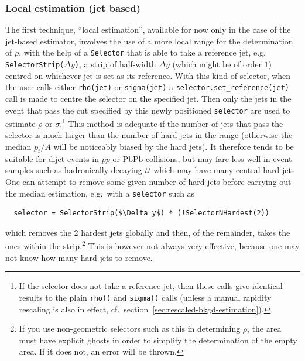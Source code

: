 \documentclass[12pt,a4]{article}
\newcommand{\ttt}[1]{{\small\texttt{#1}}}
\begin{document}
\subsubsection{Local estimation (jet based)}
\label{sec:local-bkgd-estimation}

The first technique, ``local estimation'', available for now only in
the case of the jet-based estimator, involves the use of a more local
range for the determination of $\rho$, with the help of a
\ttt{Selector} that is able to take a reference jet,
e.g. \ttt{SelectorStrip(}$\Delta y$\ttt{)}, a strip of half-width
$\Delta y$ (which might be of order $1$) centred on whichever jet is
set as its reference.
%
With this kind of selector, when the user calls either \ttt{rho(jet)}
or \ttt{sigma(jet)} a \ttt{selector.set\_reference(jet)} call is made
to centre the selector on the specified jet. Then only the jets in the
event that
pass the cut specified by this newly positioned \ttt{selector} are
used to estimate $\rho$ or $\sigma$.\footnote{If the selector does not
  take a reference jet, then these calls give identical results to the
  plain \texttt{rho()} and \texttt{sigma()} calls (unless a manual
  rapidity rescaling is also in effect, cf.\
  section~\ref{sec:rescaled-bkgd-estimation}).}
%
This method is adequate if the number of jets that pass the selector
is much larger than the number of hard jets in the range (otherwise
the median $p_t/A$ will be noticeably biased by the hard jets).
%
It therefore tends to be suitable for dijet events in $pp$ or PbPb
collisions, but may fare less well in event samples such as
hadronically decaying $t\bar t$ which may have many central hard jets.
%
One can attempt to remove some given number of hard jets before
carrying out the median estimation, e.g.\ with a \ttt{selector} such
as
\begin{lstlisting}
  selector = SelectorStrip($\Delta y$) * (!SelectorNHardest(2))
\end{lstlisting}
which removes the 2 hardest jets globally and then, of the remainder,
takes the ones within the strip.\footnote{If you use non-geometric
  selectors such as this in determining $\rho$, the area must have
  explicit ghosts in order to simplify the determination of the empty
  area. If it does not, an error will be thrown.}
%
This is however not always very effective, because one may not know
how many hard jets to remove.

\end{document}
